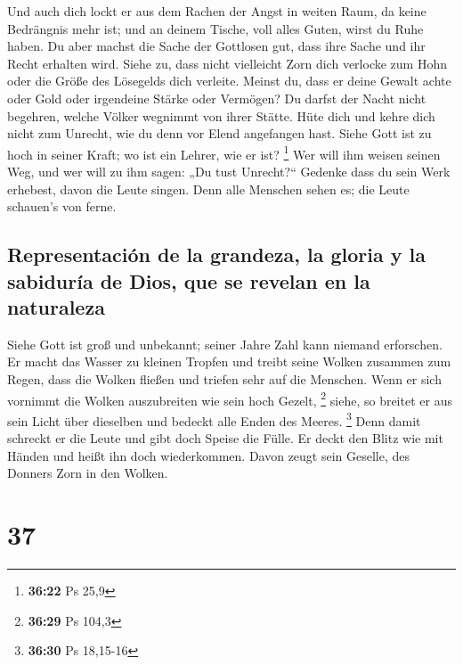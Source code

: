  Und auch dich lockt er aus dem Rachen der Angst in
weiten Raum, da keine Bedrängnis mehr ist; und an deinem Tische, voll
alles Guten, wirst du Ruhe haben.  Du aber machst die
Sache der Gottlosen gut, dass ihre Sache und ihr Recht erhalten wird.
 Siehe zu, dass nicht vielleicht Zorn dich verlocke zum
Hohn oder die Größe des Lösegelds dich verleite.  Meinst
du, dass er deine Gewalt achte oder Gold oder irgendeine Stärke oder
Vermögen?  Du darfst der Nacht nicht begehren, welche
Völker wegnimmt von ihrer Stätte.  Hüte dich und kehre
dich nicht zum Unrecht, wie du denn vor Elend angefangen hast.
 Siehe Gott ist zu hoch in seiner Kraft; wo ist ein
Lehrer, wie er ist? \footnote{\textbf{36:22} Ps 25,9} 
Wer will ihm weisen seinen Weg, und wer will zu ihm sagen: „Du tust
Unrecht?{}``  Gedenke dass du sein Werk erhebest, davon
die Leute singen.  Denn alle Menschen sehen es; die Leute
schauen's von ferne.

\hypertarget{representaciuxf3n-de-la-grandeza-la-gloria-y-la-sabiduruxeda-de-dios-que-se-revelan-en-la-naturaleza}{%
\subsection{Representación de la grandeza, la gloria y la sabiduría de
Dios, que se revelan en la
naturaleza}\label{representaciuxf3n-de-la-grandeza-la-gloria-y-la-sabiduruxeda-de-dios-que-se-revelan-en-la-naturaleza}}

 Siehe Gott ist groß und unbekannt; seiner Jahre Zahl
kann niemand erforschen.  Er macht das Wasser zu kleinen
Tropfen und treibt seine Wolken zusammen zum Regen,  dass
die Wolken fließen und triefen sehr auf die Menschen. 
Wenn er sich vornimmt die Wolken auszubreiten wie sein hoch Gezelt,
\footnote{\textbf{36:29} Ps 104,3}  siehe, so breitet er
aus sein Licht über dieselben und bedeckt alle Enden des Meeres.
\footnote{\textbf{36:30} Ps 18,15-16}  Denn damit
schreckt er die Leute und gibt doch Speise die Fülle.  Er
deckt den Blitz wie mit Händen und heißt ihn doch wiederkommen.
 Davon zeugt sein Geselle, des Donners Zorn in den
Wolken.

\hypertarget{section-36}{%
\section{37}\label{section-36}}

